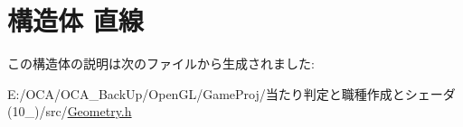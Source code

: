 \hypertarget{struct_xE7_x9B_xB4_xE7_xB7_x9A}{\section{構造体 直線}
\label{struct_xE7_x9B_xB4_xE7_xB7_x9A}
}


この構造体の説明は次のファイルから生成されました\-:\begin{DoxyCompactItemize}
\item 
E\-:/\-O\-C\-A/\-O\-C\-A\-\_\-\-Back\-Up/\-Open\-G\-L/\-Game\-Proj/当たり判定と職種作成とシェーダ(10\-\_)/src/\hyperlink{_geometry_8h}{Geometry.\-h}\end{DoxyCompactItemize}

